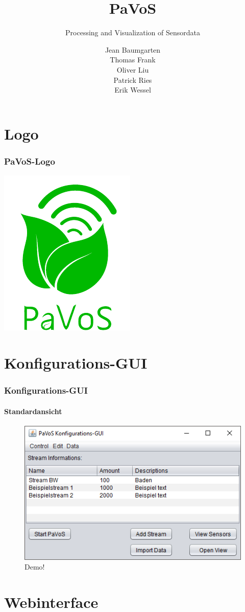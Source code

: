 \documentclass{beamer}
\title{PaVoS}
\subtitle{Processing and Visualization of Sensordata}
\author[ ]{Jean Baumgarten\\Thomas Frank\\Oliver Liu\\Patrick Ries\\Erik Wessel}
\begin{document}
	
\frame{\titlepage}

\section{Logo}

\begin{frame}
	\frametitle{PaVoS-Logo}
	\centering
	\includegraphics{images/PaVoSLogo-Erweitert}
\end{frame}

\section{Konfigurations-GUI}

\begin{frame}
	\frametitle{Konfigurations-GUI}
	\framesubtitle{Standardansicht}
	\begin{figure}
		\centering
		\includegraphics[width=0.7\linewidth]{gui/backend/BackendGUIMain}
		\caption{Demo!}
	\end{figure}
\end{frame}

\section{Webinterface}
\end{document}
